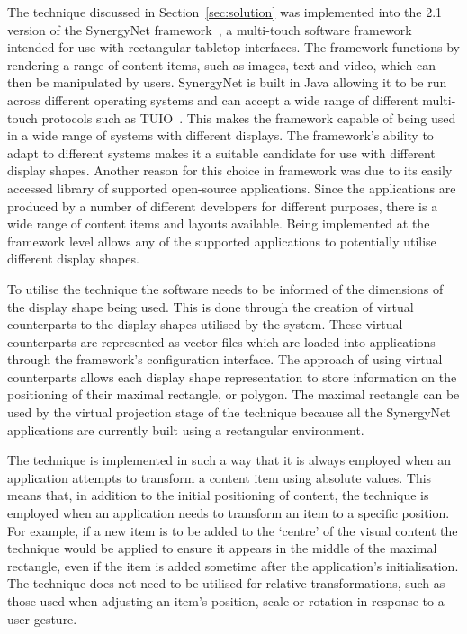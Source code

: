 \documentclass[review,5p,times,twocolumn]{elsarticle}
\begin{document}
The technique discussed in Section~\ref{sec:solution} was implemented into the 2.1 version of the SynergyNet framework~\cite{McNaughton2017,AlAgha2010}, a multi-touch software framework intended for use with rectangular tabletop interfaces.
The framework functions by rendering a range of content items, such as images, text and video, which can then be manipulated by users.
SynergyNet is built in Java allowing it to be run across different operating systems and can accept a wide range of different multi-touch protocols such as TUIO~\cite{Kaltenbrunner2007}.
This makes the framework capable of being used in a wide range of systems with different displays.
The framework's ability to adapt to different systems makes it a suitable candidate for use with different display shapes.
Another reason for this choice in framework was due to its easily accessed library of supported open-source applications.
Since the applications are produced by a number of different developers for different purposes, there is a wide range of content items and layouts available.
Being implemented at the framework level allows any of the supported applications to potentially utilise different display shapes.

To utilise the technique the software needs to be informed of the dimensions of the display shape being used.
This is done through the creation of virtual counterparts to the display shapes utilised by the system.
These virtual counterparts are represented as vector files which are loaded into applications through the framework's configuration interface.
The approach of using virtual counterparts allows each display shape representation to store information on the positioning of their maximal rectangle, or polygon.
The maximal rectangle can be used by the virtual projection stage of the technique because all the SynergyNet applications are currently built using a rectangular environment.

The technique is implemented in such a way that it is always employed when an application attempts to transform a content item using absolute values.
This means that, in addition to the initial positioning of content, the technique is employed when an application needs to transform an item to a specific position.
For example, if a new item is to be added to the `centre' of the visual content the technique would be applied to ensure it appears in the middle of the maximal rectangle, even if the item is added sometime after the application's initialisation.
The technique does not need to be utilised for relative transformations, such as those used when adjusting an item's position, scale or rotation in response to a user gesture.
\end{document}
